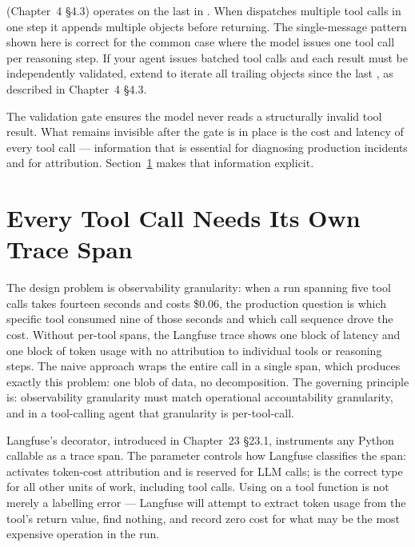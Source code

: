 \begin{notebox}
 (Chapter~4 \S4.3) operates on the last
 in . When 
dispatches multiple tool calls in one step it appends multiple
 objects before returning. The single-message pattern
shown here is correct for the common case where the model issues one tool
call per reasoning step. If your agent issues batched tool calls and each
result must be independently validated, extend  to
iterate all trailing  objects since the last
, as described in Chapter~4 \S4.3.
\end{notebox}

The validation gate ensures the model never reads a structurally invalid
tool result. What remains invisible after the gate is in place is the cost
and latency of every tool call --- information that is essential for
diagnosing production incidents and for attribution. Section~\ref{sec:react-langfuse}
makes that information explicit.


\section{Every Tool Call Needs Its Own Trace Span}
\label{sec:react-langfuse}

The design problem is observability granularity: when a run spanning five
tool calls takes fourteen seconds and costs \$0.06, the production question
is which specific tool consumed nine of those seconds and which call
sequence drove the cost. Without per-tool spans, the Langfuse trace shows
one block of latency and one block of token usage with no attribution to
individual tools or reasoning steps. The naive approach wraps the entire
 call in a single  span, which produces
exactly this problem: one blob of data, no decomposition. The governing
principle is: observability granularity must match operational
accountability granularity, and in a tool-calling agent that granularity
is per-tool-call.

Langfuse's  decorator, introduced in Chapter~23 \S23.1,
instruments any Python callable as a trace span. The 
parameter controls how Langfuse classifies the span: 
activates token-cost attribution and is reserved for LLM calls;
 is the correct type for all other units of work, including
tool calls. Using  on a tool function is not merely
a labelling error --- Langfuse will attempt to extract token usage from
the tool's return value, find nothing, and record zero cost for what may
be the most expensive operation in the run.

